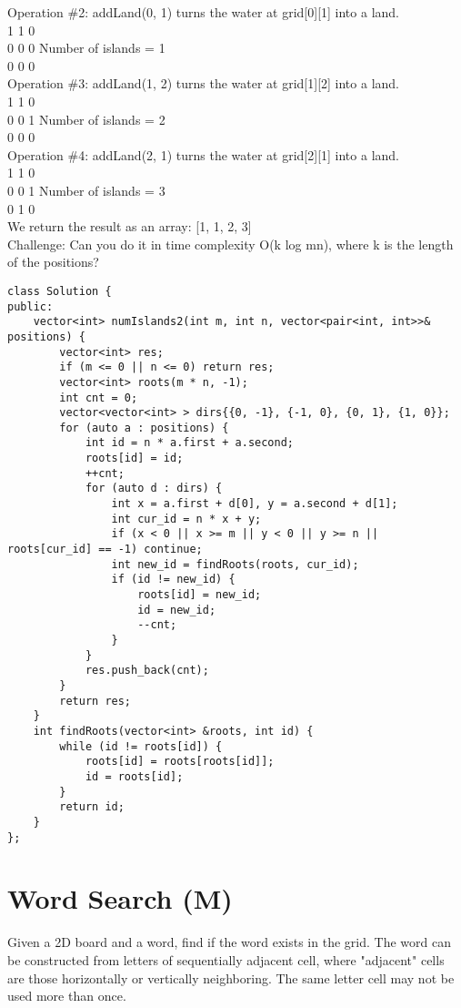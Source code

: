 Operation \#2: addLand(0, 1) turns the water at grid[0][1] into a land.\\
1 1 0\\
0 0 0   Number of islands = 1\\
0 0 0\\

Operation \#3: addLand(1, 2) turns the water at grid[1][2] into a land.\\
1 1 0\\
0 0 1   Number of islands = 2\\
0 0 0\\

Operation \#4: addLand(2, 1) turns the water at grid[2][1] into a land.\\
1 1 0\\
0 0 1   Number of islands = 3\\
0 1 0\\

We return the result as an array: [1, 1, 2, 3]\\

Challenge: Can you do it in time complexity O(k log mn), where k is the length of the positions?\\

\begin{lstlisting}
class Solution {
public:
    vector<int> numIslands2(int m, int n, vector<pair<int, int>>& positions) {
        vector<int> res;
        if (m <= 0 || n <= 0) return res;
        vector<int> roots(m * n, -1);
        int cnt = 0;
        vector<vector<int> > dirs{{0, -1}, {-1, 0}, {0, 1}, {1, 0}};
        for (auto a : positions) {
            int id = n * a.first + a.second;
            roots[id] = id;
            ++cnt;
            for (auto d : dirs) {
                int x = a.first + d[0], y = a.second + d[1];
                int cur_id = n * x + y;
                if (x < 0 || x >= m || y < 0 || y >= n || roots[cur_id] == -1) continue;
                int new_id = findRoots(roots, cur_id);
                if (id != new_id) {
                    roots[id] = new_id;
                    id = new_id;
                    --cnt;
                }
            }
            res.push_back(cnt);
        }
        return res;
    }
    int findRoots(vector<int> &roots, int id) {
        while (id != roots[id]) {
            roots[id] = roots[roots[id]];
            id = roots[id];
        }
        return id;
    }
};
\end{lstlisting}


\section{Word Search (M)}
Given a 2D board and a word, find if the word exists in the grid. The word can be constructed from letters of sequentially adjacent cell, where "adjacent" cells are those horizontally or vertically neighboring. The same letter cell may not be used more than once.

